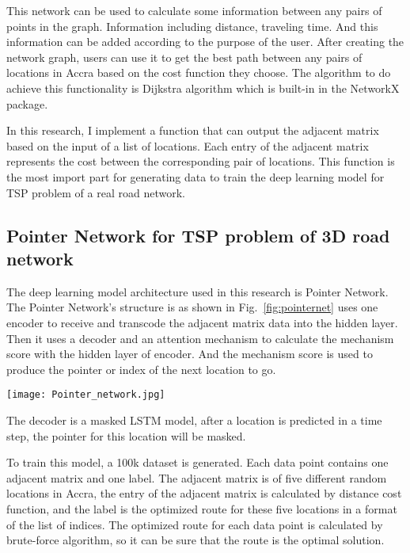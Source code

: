 \documentclass[final-report]{report-template}
\begin{document}
This network can be used to calculate some information between any pairs of points in the graph.
Information including distance, traveling time. And this information can be added according to the purpose of the user.
After creating the network graph, users can use it to get the best path between any pairs of locations in Accra based on the cost function they choose.
The algorithm to do achieve this functionality is Dijkstra algorithm which is built-in in the NetworkX package.

In this research, I implement a function that can output the adjacent matrix based on the input of a list of locations.
Each entry of the adjacent matrix represents the cost between the corresponding pair of locations. 
This function is the most import part for generating data to train the deep learning model for TSP problem of a real road network.

\subsection {Pointer Network for TSP problem of 3D road network}
The deep learning model architecture used in this research is Pointer Network\cite{vinyals2017pointer}.
The Pointer Network's structure is as shown in Fig.~\ref{fig:pointernet} uses one encoder to receive and transcode the adjacent matrix data into the hidden layer.
Then it uses a decoder and an attention mechanism to calculate the mechanism score with the hidden layer of encoder.
And the mechanism score is used to produce the pointer or index of the next location to go.

\begin{figure*}[htbp]
    \centering
    \texttt{[image: Pointer\_network.jpg]}
    \caption{\label{fig:pointernet}Illustration of pointer network}
\end{figure*}

The decoder is a masked LSTM model, after a location is predicted in a time step, the pointer for this location will be masked.

To train this model, a 100k dataset is generated. Each data point contains one adjacent matrix and one label.
The adjacent matrix is of five different random locations in Accra, the entry of the adjacent matrix is calculated by distance cost function,
and the label is the optimized route for these five locations in a format of the list of indices.
The optimized route for each data point is calculated by brute-force algorithm, so it can be sure that the route is the optimal solution.
\end{document}
